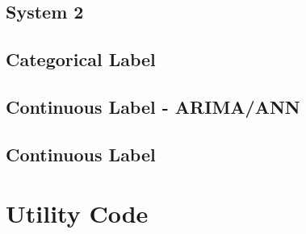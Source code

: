 \subsection{System 2}
\label{appA:ts_2}


\subsection{Categorical Label}
\label{appA:ts_4}


\subsection{Continuous Label - ARIMA/ANN}
\label{appA:ts_3a}


\subsection{Continuous Label}
\label{appA:ts_3}


\section{Utility Code}
\label{appA:utility}

